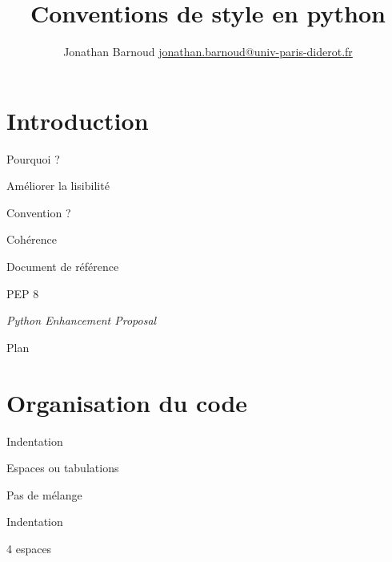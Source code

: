 \documentclass[xcolor=pdftex,dvipsnames,table,handout]{beamer}
\title{Conventions de style en python}
\author{Jonathan Barnoud \url{jonathan.barnoud@univ-paris-diderot.fr}}
\date{}
\begin{document}
\titleframe{}

\section*{Introduction}

\begin{frame}{Pourquoi ?}
\begin{center}
\Huge{Améliorer la lisibilité}
\end{center}
\end{frame}

\begin{frame}{Convention ?}
\begin{center}
\Huge{Cohérence}
\vspace{1cm}

\Large{}
\end{center}
\end{frame}

\begin{frame}{Document de référence}
\begin{center}
\Huge{PEP 8}
\vspace{1cm}

\Large{\textit{Python Enhancement Proposal}}
\end{center}
\end{frame}


\begin{frame}{Plan}
\tableofcontents
\end{frame}

\section{Organisation du code}

\begin{frame}{Indentation}
\begin{center}
\Large{Espaces ou tabulations}
\vspace{2cm}

\Large{Pas de mélange}
\end{center}
\end{frame}

\begin{frame}{Indentation}
\begin{center}
\Huge{4 espaces}
\end{center}
\end{frame}
\end{document}
